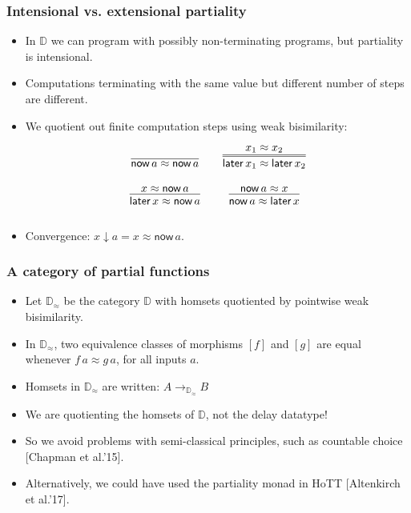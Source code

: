 \documentclass[12pt,t]{beamer}
\newcommand{\red}[1]{\textcolor{red}{#1}}
\newcommand{\now}{\mathsf{now}}
\newcommand{\later}{\mathsf{later}}
\newcommand{\dn}{\downarrow}
\newcommand{\D}{\mathbb{D}}
\newcommand{\Dapprox}{\mathbb{D}_{\approx}}
\begin{document}
\begin{frame}

  \frametitle{Intensional vs. extensional partiality}
  \begin{itemize}
  \item In $\D$ we can program with possibly non-terminating
    programs, but partiality is intensional.
  \item Computations terminating with the same value but 
    different number of steps are different.
  \item We quotient out finite computation steps using weak
    bisimilarity:
    \[
      \arraycolsep=10pt\def\arraystretch{2.8}
      \begin{array}{cc}
        \infer{\now\,a \approx \now\,a}{}
        &
        \infer={\later\,x_1 \approx \later\,x_2}{x_1 \approx x_2}
        \\
        \infer{\later\,x \approx \now\,a}{x \approx \now \,a}
        &
        \infer{\now\,a \approx \later\,x}{\now\,a \approx x}
      \end{array}
    \]
    \item Convergence: $x \dn a = x \approx \now\,a$.
  \end{itemize}
  
  
\end{frame}

\begin{frame}

  \frametitle{A category of partial functions}
  \begin{itemize}
    \item Let $\Dapprox$ be the category $\D$ with homsets
      quotiented by pointwise weak bisimilarity.
    \item In $\Dapprox$, two equivalence classes of morphisms $[f]$ and $[g]$ are equal whenever
      $f \, a \approx g \, a$, for all inputs $a$.
    \item Homsets in $\Dapprox$ are written: $A \to_{\Dapprox} B$   
      \pause
      \vspace{\fill}
    \item We are quotienting the homsets of $\D$, not the delay datatype!
    \item So we avoid problems with semi-classical principles, such as countable choice [Chapman et al.'15].
    \item Alternatively, we could have used the partiality monad in
      HoTT [Altenkirch et al.'17].

  \end{itemize}
  
  
\end{frame}
\end{document}
